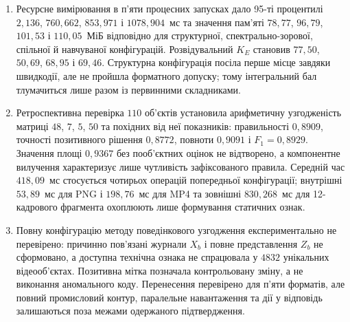 \begin{enumerate}[label=\arabic*.]
\item Ресурсне вимірювання в п’яти процесних запусках дало 95-ті процентилі $2{,}136$, $760{,}662$, $853{,}971$ і $1078{,}904$~мс та значення пам’яті $78{,}77$, $96{,}79$, $101{,}53$ і $110{,}05$~МіБ відповідно для структурної, спектрально-зорової, спільної й навчуваної конфігурацій. Розвідувальний $K_E$ становив $77{,}50$, $50{,}69$, $68{,}95$ і $69{,}46$. Структурна конфігурація посіла перше місце завдяки швидкодії, але не пройшла форматного допуску; тому інтегральний бал тлумачиться лише разом із первинними складниками.

\item Ретроспективна перевірка $110$ об’єктів установила арифметичну узгодженість матриці $48$, $7$, $5$, $50$ та похідних від неї показників: правильності $0{,}8909$, точності позитивного рішення $0{,}8772$, повноти $0{,}9091$ і $F_1=0{,}8929$. Значення площі $0{,}9367$ без пооб’єктних оцінок не відтворено, а компонентне вилучення характеризує лише чутливість зафіксованого правила. Середній час $418{,}09$~мс стосується чотирьох операцій попередньої конфігурації; внутрішні $53{,}89$~мс для PNG і $198{,}76$~мс для MP4 та зовнішні $830{,}268$~мс для 12-кадрового фрагмента охоплюють лише формування статичних ознак.

\item Повну конфігурацію методу поведінкового узгодження експериментально не перевірено: причинно пов’язані журнали $X_b$ і повне представлення $Z_b$ не сформовано, а доступна технічна ознака не спрацювала у $4832$ унікальних відеооб’єктах. Позитивна мітка позначала контрольовану зміну, а не виконання аномального коду. Перенесення перевірено для п’яти форматів, але повний промисловий контур, паралельне навантаження та дії у відповідь залишаються поза межами одержаного підтвердження.
\end{enumerate}
